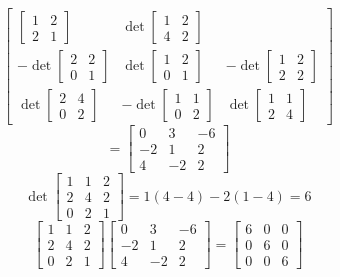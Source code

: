 \begin{itemize}
$$\begin{bmatrix}
\begin{bmatrix}
1 & 2 \\
2 & 1
\end{bmatrix} & \det\begin{bmatrix}
1 & 2 \\
4 & 2
\end{bmatrix} \\
-\det\begin{bmatrix}
2 & 2 \\
0 & 1
\end{bmatrix} & \det\begin{bmatrix}
1 & 2 \\
0 & 1
\end{bmatrix} & -\det\begin{bmatrix}
1 & 2 \\
2 & 2
\end{bmatrix} \\
\det\begin{bmatrix}
2 & 4 \\
0 & 2
\end{bmatrix} & -\det\begin{bmatrix}
1 & 1 \\
0 & 2
\end{bmatrix} & \det\begin{bmatrix}
1 & 1 \\
2 & 4
\end{bmatrix}
\end{bmatrix}$$
$$= \begin{bmatrix}
0 & 3 & -6 \\
-2 & 1 & 2 \\
4 & -2 & 2
\end{bmatrix}$$
$$\det\begin{bmatrix}
1 & 1 & 2 \\
2 & 4 & 2 \\
0 & 2 & 1
\end{bmatrix} = 1(4 - 4) - 2(1 - 4) = 6$$
$$\begin{bmatrix}
1 & 1 & 2 \\
2 & 4 & 2 \\
0 & 2 & 1
\end{bmatrix}\begin{bmatrix}
0 & 3 & -6 \\
-2 & 1 & 2 \\
4 & -2 & 2
\end{bmatrix} = \begin{bmatrix}
6 & 0 & 0 \\
0 & 6 & 0 \\
0 & 0 & 6
\end{bmatrix}$$

\end{itemize}
